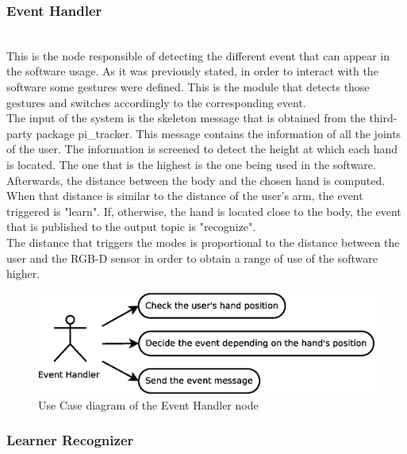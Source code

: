 \subsubsection{Event Handler}\\

	This is the node responsible of detecting the different event that can appear in the software usage. As it was previously stated, in order to interact with the software some gestures were defined. This is the module that detects those gestures and switches accordingly to the corresponding event. 
	\\

	The input of the system is the skeleton message that is obtained from the third-party package pi\_tracker. This message contains the information of all the joints of the user. The information is screened to detect the height at which each hand is located. The one that is the highest is the one being used in the software. Afterwards, the distance between the body and the chosen hand is computed. When that distance is similar to the distance of the user's arm, the event triggered is "learn". If, otherwise, the hand is located close to the body, the event that is published to the output topic is "recognize". 
	\\

	The distance that triggers the modes is proportional to the distance between the user and the RGB-D sensor in order to obtain a range of use of the software higher. 
	\begin{figure}[H]
		\centering
			\includegraphics[scale=0.4]{img/diagrams/uc_event_handler.eps}
			\caption[Use case diagram Event Handler node]{Use Case diagram of the Event Handler node}
		
	\end{figure}

\subsubsection{Learner Recognizer}\\
\label{learner_recognizer}

